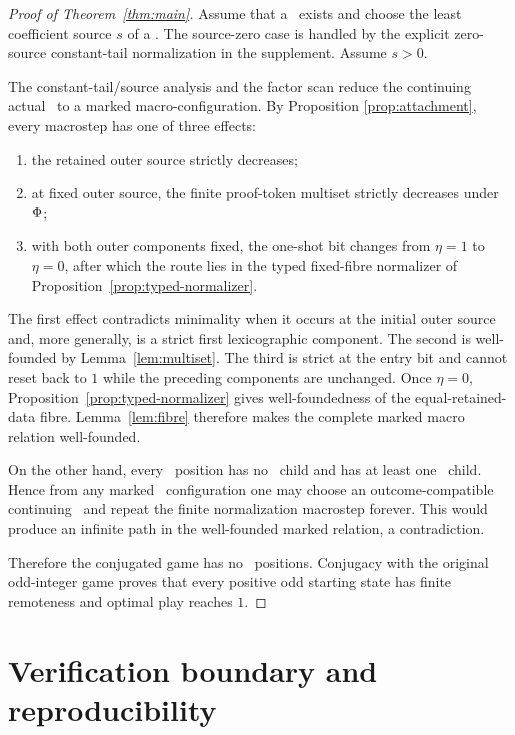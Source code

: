 \begin{proof}[Proof of Theorem~\ref{thm:main}]
Assume that a \DRAW\ exists and choose the least coefficient source $s$ of a
\DRAW. The source-zero case is handled by the explicit zero-source
constant-tail normalization in the supplement. Assume $s>0$.

The constant-tail/source analysis and the factor scan reduce the continuing
actual \DRAW\ to a marked macro-configuration. By Proposition
\ref{prop:attachment}, every macrostep has one of three effects:
\begin{enumerate}[label=(\arabic*)]
\item the retained outer source strictly decreases;
\item at fixed outer source, the finite proof-token multiset strictly
      decreases under $\Phi$;
\item with both outer components fixed, the one-shot bit changes from
      $\eta=1$ to $\eta=0$, after which the route lies in the typed fixed-fibre
      normalizer of Proposition~\ref{prop:typed-normalizer}.
\end{enumerate}
The first effect contradicts minimality when it occurs at the initial outer
source and, more generally, is a strict first lexicographic component. The
second is well-founded by Lemma~\ref{lem:multiset}. The third is strict at the
entry bit and cannot reset back to $1$ while the preceding components are
unchanged. Once $\eta=0$, Proposition~\ref{prop:typed-normalizer} gives
well-foundedness of the equal-retained-data fibre. Lemma~\ref{lem:fibre}
therefore makes the complete marked macro relation well-founded.

On the other hand, every \DRAW\ position has no \LOSS\ child and has at least
one \DRAW\ child. Hence from any marked \DRAW\ configuration one may choose an
outcome-compatible continuing \DRAW\ and repeat the finite normalization
macrostep forever. This would produce an infinite path in the well-founded
marked relation, a contradiction.

Therefore the conjugated game has no \DRAW\ positions. Conjugacy with the
original odd-integer game proves that every positive odd starting state has
finite remoteness and optimal play reaches $1$.
\end{proof}

\section{Verification boundary and reproducibility}\label{sec:repro}

